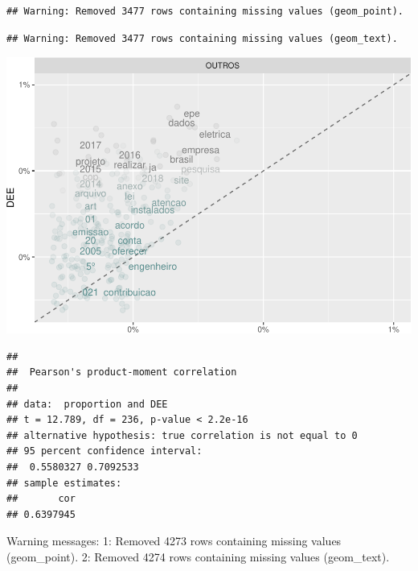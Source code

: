 \documentclass[]{article}
\newenvironment{Shaded}{\begin{snugshade}}{\end{snugshade}}
\newcommand{\KeywordTok}[1]{\textcolor[rgb]{0.13,0.29,0.53}{\textbf{#1}}}
\newcommand{\DataTypeTok}[1]{\textcolor[rgb]{0.13,0.29,0.53}{#1}}
\newcommand{\StringTok}[1]{\textcolor[rgb]{0.31,0.60,0.02}{#1}}
\newcommand{\FunctionTok}[1]{\textcolor[rgb]{0.00,0.00,0.00}{#1}}
\newcommand{\OperatorTok}[1]{\textcolor[rgb]{0.81,0.36,0.00}{\textbf{#1}}}
\newcommand{\AttributeTok}[1]{\textcolor[rgb]{0.77,0.63,0.00}{#1}}
\newcommand{\NormalTok}[1]{#1}
\begin{document}
\begin{verbatim}
## Warning: Removed 3477 rows containing missing values (geom_point).
\end{verbatim}

\begin{verbatim}
## Warning: Removed 3477 rows containing missing values (geom_text).
\end{verbatim}

\includegraphics{markdown_v30_files/figure-latex/unnamed-chunk-59-1.pdf}

\begin{Shaded}
\end{Shaded}

\begin{verbatim}
## 
##  Pearson's product-moment correlation
## 
## data:  proportion and DEE
## t = 12.789, df = 236, p-value < 2.2e-16
## alternative hypothesis: true correlation is not equal to 0
## 95 percent confidence interval:
##  0.5580327 0.7092533
## sample estimates:
##       cor 
## 0.6397945
\end{verbatim}

\begin{Shaded}
\begin{Highlighting}[]
\FunctionTok{Warning messages:}
\FunctionTok{1:}\AttributeTok{ Removed 4273 rows containing missing values (geom_point). }
\FunctionTok{2:}\AttributeTok{ Removed 4274 rows containing missing values (geom_text).}
\end{Highlighting}
\end{Shaded}
\end{document}
